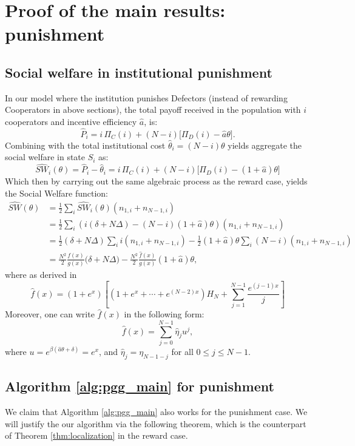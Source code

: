 \documentclass{article}
\begin{document}
\section{Proof of the  main results: punishment}
\label{sec: appendix2}
\subsection{Social welfare in institutional punishment}
\label{sec: punishment calculations}
In our model where the institution punishes Defectors (instead of rewarding Cooperators in above sections), the total payoff received in the population with $i$ cooperators and incentive efficiency $\hat{a}$, is: 
\[
\hat{P}_i = i\,\Pi_C(i) + (N - i)\big[ \Pi_D(i) - \hat{a}\theta \big].
\]
Combining with the total institutional cost $\hat{\theta}_i = (N - i)\theta$ yields aggregate the social welfare in state $S_i$ as:
\begin{equation*}
\widehat{SW}_i(\theta) = \hat{P}_i - \hat{\theta}_i =  i\,\Pi_C(i) + (N - i)\big[ \Pi_D(i) - (1+\hat{a})\theta \big]
\end{equation*}
Which then by carrying out the same algebraic process as the reward case, yields the Social Welfare function:
\begin{align}
\nonumber
\widehat{SW}(\theta) &=\frac{1}{2}\sum_i \widehat{SW}_i(\theta)(n_{1,i} + n_{N-1,i}) \\
&= \frac{1}{2}\sum_{i}( i(\delta + N\Delta) - (N - i)(1+\hat{a})\theta ) 
(n_{1,i} + n_{N-1,i}) \nonumber \\ 
\nonumber
&= \frac{1}{2}(\delta + N\Delta) \sum_{i}i (n_{1,i} + n_{N-1,i}) - \frac{1}{2}(1+\hat{a})\theta\sum_{i}(N-i) (n_{1,i} + n_{N-1,i})
\\
&= \frac{N^2}{2}\frac{f(x)}{g(x)} \big(\delta + N\Delta) - \frac{N^2}{2}\frac{\hat{f}(x)}{g(x)}(1+\hat{a})\theta, \label{eq:swp}
\end{align}
where as derived in \cite{duonghan2021cost}
\[
\hat{f}(x) = (1 + e^x)\left[ \left(1 + e^x + \cdots + e^{(N-2)x}\right) H_N 
+ \sum_{j=1}^{N-1} \frac{e^{(j-1)x}}{j} \right]
\]
Moreover, one can write $\hat{f}(x)$ in the following form:
\[
\hat{f}(x) = \sum_{j=0}^{N-1} \hat{\eta}_j u^j,
\]
where $u = e^{\beta(\hat{a}\theta + \delta)} = e^x$, and $\hat{\eta}_j = \eta_{N-1-j}$ for all $0 \le j \le N-1$.

\subsection{Algorithm \ref{alg:pgg_main} for punishment}
We claim that Algorithm \ref{alg:pgg_main} also works for the punishment case. We will justify the our algorithm via the following theorem, which is the counterpart of Theorem \ref{thm:localization} in the reward case.
\end{document}
